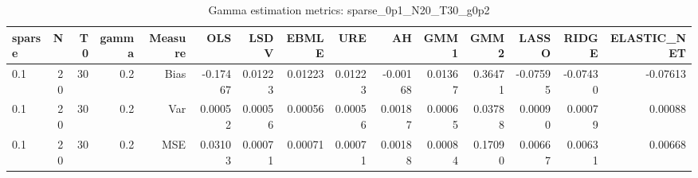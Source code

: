 \begin{table}[!htbp]\centering
\caption{Gamma estimation metrics: sparse_0p1_N20_T30_g0p2}
\label{tab:table1_sparse_0p1_N20_T30_g0p2}
\begin{tabular}{lrrrrrrrrrrrrrr}
\hline
sparse & N & T0 & gamma & Measure & OLS & LSDV & EBMLE & URE & AH & GMM1 & GMM2 & LASSO & RIDGE & ELASTIC_NET \\
\hline
0.1 & 20 & 30 & 0.2 & Bias & -0.17467 & 0.01223 & 0.01223 & 0.01223 & -0.00168 & 0.01367 & 0.36471 & -0.07595 & -0.07430 & -0.07613 \\
0.1 & 20 & 30 & 0.2 & Var & 0.00052 & 0.00056 & 0.00056 & 0.00056 & 0.00187 & 0.00065 & 0.03788 & 0.00090 & 0.00079 & 0.00088 \\
0.1 & 20 & 30 & 0.2 & MSE & 0.03103 & 0.00071 & 0.00071 & 0.00071 & 0.00188 & 0.00084 & 0.17090 & 0.00667 & 0.00631 & 0.00668 \\
\hline
\end{tabular}
\end{table}

